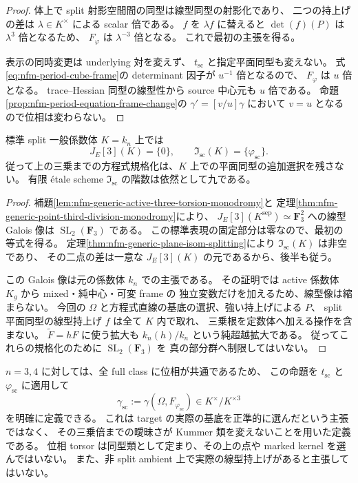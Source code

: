 \begin{proof}
体上で split 射影空間間の同型は線型同型の射影化であり、
二つの持上げの差は $\lambda\in K^\times$ による scalar 倍である。
$f$ を $\lambda f$ に替えると
$\det(f)(P)$ は $\lambda^3$ 倍となるため、
$F_\varphi$ は $\lambda^{-3}$ 倍となる。
これで最初の主張を得る。

表示の同時変更は underlying 対を変えず、
$t_{\mathrm{sc}}$ と指定平面同型も変えない。
式\eqref{eq:nfm-period-cube-frame}の determinant 因子が $u^{-1}$ 倍となるので、
$F_\varphi$ は $u$ 倍となる。
trace--Hessian 同型の線型性から source 中心元も $u$ 倍である。
命題\ref{prop:nfm-period-equation-frame-change}の
$\gamma'=[v/u]\gamma$ において $v=u$ となるので位相は変わらない。
\end{proof}

\begin{corollary}[一般係数体での平面同型の一意性]
\label{cor:nfm-generic-plane-isom-unique}
標準 split 一般係数体 $K=k_n$ 上では
\[
 J_E[3](K)=\{0\},\qquad
 \mathfrak I_{\mathrm{sc}}(K)=\{\varphi_{\mathrm{sc}}\}.
\]
従って上の三乗までの方程式規格化は、$K$ 上での平面同型の追加選択を残さない。
有限 \'etale scheme $\mathfrak I_{\mathrm{sc}}$ の階数は依然として九である。
\end{corollary}

\begin{proof}
補題\ref{lem:nfm-generic-active-three-torsion-monodromy}と
定理\ref{thm:nfm-generic-point-third-division-monodromy}により、
$J_E[3](K^{\mathrm{sep}})\simeq\mathbf F_3^2$ への線型 Galois 像は
$\operatorname{SL}_2(\mathbf F_3)$ である。
この標準表現の固定部分は零なので、最初の等式を得る。
定理\ref{thm:nfm-generic-plane-isom-splitting}により
$\mathfrak I_{\mathrm{sc}}(K)$ は非空であり、
その二点の差は一意な $J_E[3](K)$ の元であるから、後半も従う。

この Galois 像は元の係数体 $k_n$ での主張である。
その証明では active 係数体 $K_g$ から mixed・純中心・可変 frame の
独立変数だけを加えるため、線型像は縮まらない。
今回の $\Omega$ と方程式直線の基底の選択、強い持上げによる $P$、
split 平面同型の線型持上げ $f$ は全て $K$ 内で取れ、
三乗根を定数体へ加える操作を含まない。
$\widetilde F=hF$ に使う拡大も $k_n(h)/k_n$ という純超越拡大である。
従ってこれらの規格化のために $\operatorname{SL}_2(\mathbf F_3)$ を
真の部分群へ制限してはいない。
\end{proof}

$n=3,4$ に対しては、全 full class に位相が共通であるため、
この命題を $t_{\mathrm{sc}}$ と $\varphi_{\mathrm{sc}}$ に適用して
\[
 \gamma_{\mathrm{sc}}
 :=\gamma(\Omega,F_{\varphi_{\mathrm{sc}}})
       \in K^\times/K^{\times3}
\]
を明確に定義できる。
これは target の実際の基底を正準的に選んだという主張ではなく、
その三乗倍までの曖昧さが Kummer 類を変えないことを用いた定義である。
位相 torsor は同型類として定まり、その上の点や marked kernel を選んではいない。
また、非 split ambient 上で実際の線型持上げがあると主張してはいない。

